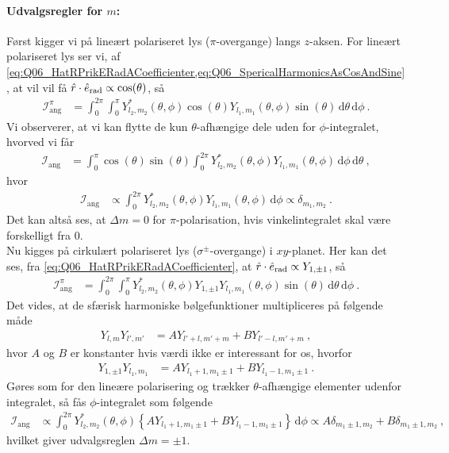 \paragraph{Udvalgsregler for $m$:} Først kigger vi på \textsf{lineært polariseret lys} ($\pi$-overgange) langs $z$-aksen. For lineært polariseret lys ser vi, af \cref{eq:Q06_HatRPrikERadACoefficienter,eq:Q06_SpericalHarmonicsAsCosAndSine}, at vil vil få $\Hat{r}\cdot\Hat{e}_\text{rad} \propto \cos(\theta)$, så
\begin{align}
    \mathcal{I}_\text{ang}^\pi &= \int_0^{2\pi}\int_0^\pi Y_{l_2,m_2}^*(\theta,\phi) \cos(\theta) Y_{l_1,m_1}(\theta,\phi) \sin(\theta) \, \text{d}\theta \, \text{d}\phi \: .
\end{align}
Vi observerer, at vi kan flytte de kun $\theta$-afhængige dele uden for $\phi$-integralet, hvorved vi får
\begin{align}
    \mathcal{I}_\text{ang} &= \int_0^\pi \cos(\theta)\sin(\theta) \int_0^{2\pi} Y_{l_2,m_2}^*(\theta,\phi) Y_{l_1,m_1}(\theta,\phi) \, \text{d}\phi \, \text{d}\theta \: ,
\end{align}
hvor
\begin{align}
    \mathcal{I}_\text{ang} &\propto \int_0^{2\pi} Y_{l_2,m_2}^*(\theta,\phi) Y_{l_1,m_1}(\theta,\phi) \, \text{d}\phi \propto \delta_{m_1,m_2} \: .
\end{align}
Det kan altså ses, at $\Delta m = 0$ for $\pi$-polarisation, hvis vinkelintegralet skal være forskelligt fra 0.\\

Nu kigges på \textsf{cirkulært polariseret lys} ($\sigma^\pm$-overgange) i $xy$-planet. Her kan det ses, fra \cref{eq:Q06_HatRPrikERadACoefficienter}, at $\Hat{r}\cdot\Hat{e}_\text{rad} \propto Y_{1,\pm 1}$, så
\begin{align}
    \mathcal{I}_\text{ang}^\pi &= \int_0^{2\pi}\int_0^\pi Y_{l_2,m_2}^*(\theta,\phi) Y_{1,\pm 1} Y_{l_1,m_1}(\theta,\phi) \sin(\theta) \, \text{d}\theta \, \text{d}\phi \: .
\end{align}
Det vides, at de sfærisk harmoniske bølgefunktioner multipliceres på følgende måde
\begin{align} \label{eq:Q06_MultiplySphericalHarmonics}
    Y_{l,m}Y_{l',m'} &= A Y_{l'+l,m'+m} + B Y_{l'-l,m'+m} \: ,
\end{align}
hvor $A$ og $B$ er konstanter hvis værdi ikke er interessant for os, hvorfor
\begin{align}
    Y_{1,\pm 1}Y_{l_1,m_1} &= A Y_{l_1 + 1,m_1 \pm 1} + B Y_{l_1-1,m_1\pm 1} \: .
\end{align}
Gøres som for den lineære polarisering og trækker $\theta$-afhængige elementer udenfor integralet, så fås $\phi$-integralet som følgende
\begin{align}
    \mathcal{I}_\text{ang} &\propto \int_0^{2\pi} Y_{l_2,m_2}^*(\theta,\phi) \left\{A Y_{l_1 + 1,m_1 \pm 1} + B Y_{l_1-1,m_1\pm 1}\right\} \, \text{d}\phi \propto A\delta_{m_1\pm1,m_2} + B\delta_{m_1\pm1,m_2} \: ,
\end{align}
hvilket giver udvalgsreglen $\Delta m = \pm 1$.\\

